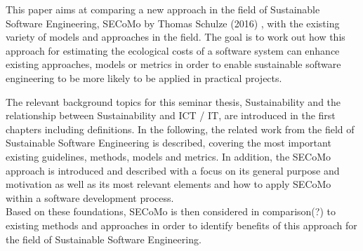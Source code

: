 This paper aims at comparing a new approach in the field of Sustainable Software Engineering, SECoMo by Thomas Schulze (2016) %
, with the existing variety of models and approaches in the field. The goal %
is to work out how this approach for estimating the ecological costs of a software system can enhance existing approaches, models or metrics %
in order to enable sustainable software engineering to be more likely to be applied in practical projects. %


The relevant background topics for this seminar thesis, Sustainability and the relationship %
between Sustainability and ICT / IT, %
are introduced in the first chapters including definitions. %
In the following, the related work from the field of Sustainable Software Engineering is described, covering the %
most important existing guidelines, methods, models and metrics. %
In addition, the SECoMo approach is introduced %
and described with a focus on its general purpose and motivation as well as its most relevant elements and how to apply SECoMo within a software development process. %
\\ Based on these foundations, SECoMo is then considered in comparison(?) to %
existing methods and approaches in order to identify benefits of this approach for the field of Sustainable Software Engineering.




